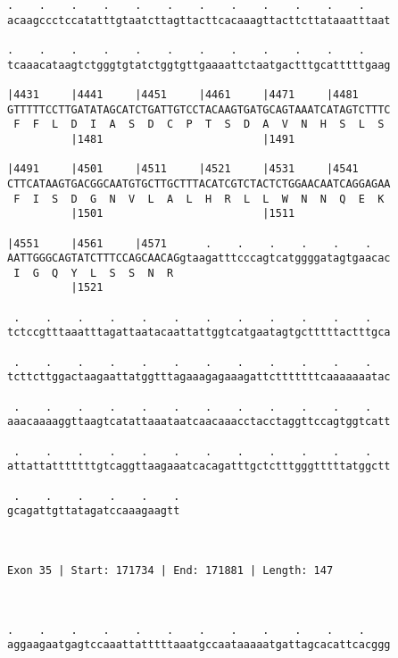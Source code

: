 \documentclass{article}
\begin{document}
\begin{Verbatim}
.    .    .    .    .    .    .    .    .    .    .    .    
acaagccctccatatttgtaatcttagttacttcacaaagttacttcttataaatttaat
                                                            
.    .    .    .    .    .    .    .    .    .    .    .    
tcaaacataagtctgggtgtatctggtgttgaaaattctaatgactttgcatttttgaag
                                                            
|4431     |4441     |4451     |4461     |4471     |4481     
GTTTTTCCTTGATATAGCATCTGATTGTCCTACAAGTGATGCAGTAAATCATAGTCTTTC
 F  F  L  D  I  A  S  D  C  P  T  S  D  A  V  N  H  S  L  S 
          |1481                         |1491               
  
|4491     |4501     |4511     |4521     |4531     |4541     
CTTCATAAGTGACGGCAATGTGCTTGCTTTACATCGTCTACTCTGGAACAATCAGGAGAA
 F  I  S  D  G  N  V  L  A  L  H  R  L  L  W  N  N  Q  E  K 
          |1501                         |1511               
  
|4551     |4561     |4571      .    .    .    .    .    .   
AATTGGGCAGTATCTTTCCAGCAACAGgtaagatttcccagtcatggggatagtgaacac
 I  G  Q  Y  L  S  S  N  R                                  
          |1521                                             
  
 .    .    .    .    .    .    .    .    .    .    .    .   
tctccgtttaaatttagattaatacaattattggtcatgaatagtgctttttactttgca
                                                            
 .    .    .    .    .    .    .    .    .    .    .    .   
tcttcttggactaagaattatggtttagaaagagaaagattctttttttcaaaaaaatac
                                                            
 .    .    .    .    .    .    .    .    .    .    .    .   
aaacaaaaggttaagtcatattaaataatcaacaaacctacctaggttccagtggtcatt
                                                            
 .    .    .    .    .    .    .    .    .    .    .    .   
attattatttttttgtcaggttaagaaatcacagatttgctctttgggtttttatggctt
                                                            
 .    .    .    .    .    .
gcagattgttatagatccaaagaagtt
                           
                           
 
Exon 35 | Start: 171734 | End: 171881 | Length: 147



.    .    .    .    .    .    .    .    .    .    .    .    
aggaagaatgagtccaaattatttttaaatgccaataaaaatgattagcacattcacggg
                                                            

\end{Verbatim}
\end{document}
